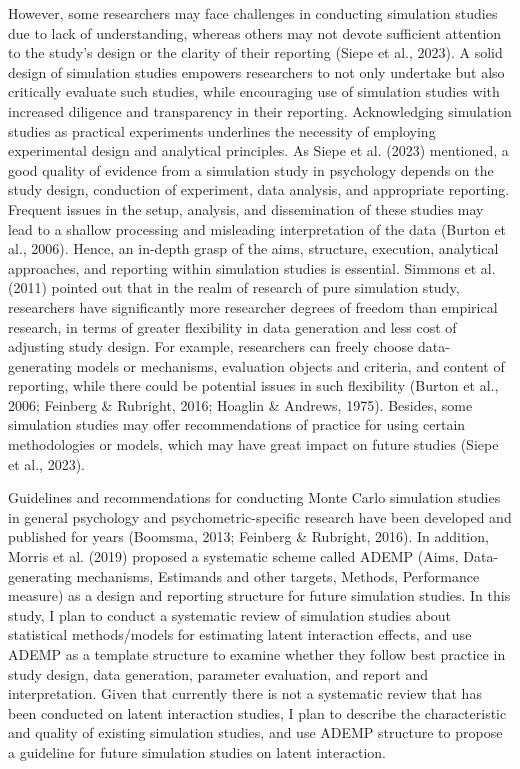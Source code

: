 \documentclass[
  man]{apa6}
\begin{document}
However, some researchers may face challenges in conducting simulation studies due to lack of understanding, whereas others may not devote sufficient attention to the study's design or the clarity of their reporting (Siepe et al., 2023). A solid design of simulation studies empowers researchers to not only undertake but also critically evaluate such studies, while encouraging use of simulation studies with increased diligence and transparency in their reporting. Acknowledging simulation studies as practical experiments underlines the necessity of employing experimental design and analytical principles. As Siepe et al. (2023) mentioned, a good quality of evidence from a simulation study in psychology depends on the study design, conduction of experiment, data analysis, and appropriate reporting. Frequent issues in the setup, analysis, and dissemination of these studies may lead to a shallow processing and misleading interpretation of the data (Burton et al., 2006). Hence, an in-depth grasp of the aims, structure, execution, analytical approaches, and reporting within simulation studies is essential. Simmons et al. (2011) pointed out that in the realm of research of pure simulation study, researchers have significantly more researcher degrees of freedom than empirical research, in terms of greater flexibility in data generation and less cost of adjusting study design. For example, researchers can freely choose data-generating models or mechanisms, evaluation objects and criteria, and content of reporting, while there could be potential issues in such flexibility (Burton et al., 2006; Feinberg \& Rubright, 2016; Hoaglin \& Andrews, 1975). Besides, some simulation studies may offer recommendations of practice for using certain methodologies or models, which may have great impact on future studies (Siepe et al., 2023).

Guidelines and recommendations for conducting Monte Carlo simulation studies in general psychology and psychometric-specific research have been developed and published for years (Boomsma, 2013; Feinberg \& Rubright, 2016). In addition, Morris et al. (2019) proposed a systematic scheme called ADEMP (Aims, Data-generating mechanisms, Estimands and other targets, Methods, Performance measure) as a design and reporting structure for future simulation studies. In this study, I plan to conduct a systematic review of simulation studies about statistical methods/models for estimating latent interaction effects, and use ADEMP as a template structure to examine whether they follow best practice in study design, data generation, parameter evaluation, and report and interpretation. Given that currently there is not a systematic review that has been conducted on latent interaction studies, I plan to describe the characteristic and quality of existing simulation studies, and use ADEMP structure to propose a guideline for future simulation studies on latent interaction.
\end{document}
